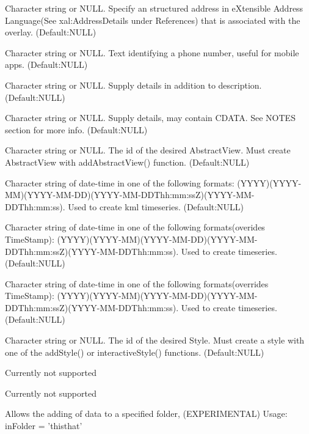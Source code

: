 \documentclass[a4paper]{book}
\begin{document}
\begin{Arguments}
\begin{ldescription}
\item[\code{xalAddressDetails}] Character string or NULL. Specify an structured address in eXtensible Address Language(See xal:AddressDetails under References) that is associated with the overlay. (Default:NULL) 
\item[\code{phoneNumber}]  Character string or NULL. Text identifying a phone number, useful for mobile apps. (Default:NULL) 
\item[\code{Snippet}] Character string or NULL. Supply details in addition to description. (Default:NULL)
\item[\code{description}] Character string or NULL. Supply details, may contain CDATA. See NOTES section for more info. (Default:NULL)
\item[\code{AbstractView}] Character string or NULL. The id of the desired AbstractView. Must create AbstractView with addAbstractView() function. (Default:NULL)
\item[\code{TimeStamp}]  Character string of date-time in one of the following formats: (YYYY)(YYYY-MM)(YYYY-MM-DD)(YYYY-MM-DDThh:mm:ssZ)(YYYY-MM-DDThh:mm:ss). Used to create kml timeseries. (Default:NULL)
\item[\code{TimeSpanStart}]  Character string of date-time in one of the following formats(overides TimeStamp): (YYYY)(YYYY-MM)(YYYY-MM-DD)(YYYY-MM-DDThh:mm:ssZ)(YYYY-MM-DDThh:mm:ss). Used to create timeseries. (Default:NULL)
\item[\code{TimeSpanEnd}]  Character string of date-time in one of the following formats(overrides TimeStamp): (YYYY)(YYYY-MM)(YYYY-MM-DD)(YYYY-MM-DDThh:mm:ssZ)(YYYY-MM-DDThh:mm:ss). Used to create timeseries. (Default:NULL) 
\item[\code{styleUrl}] Character string or NULL. The id of the desired Style. Must create a style with one of the addStyle() or interactiveStyle() functions. (Default:NULL)
\item[\code{Region}] Currently not supported
\item[\code{ExtendedData}] Currently not supported
\item[\code{inFolder}] Allows the adding of data to a specified folder, (EXPERIMENTAL) Usage: inFolder = 'this\bsl{}that'   
\end{ldescription}
\end{Arguments}
%
\end{document}
